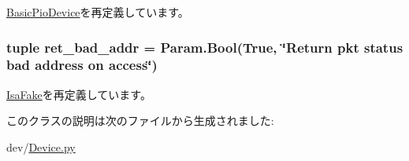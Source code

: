 \hyperlink{classDevice_1_1BasicPioDevice_aac8239d62c5a04a05fcc71d4ac63fdb4}{BasicPioDevice}を再定義しています。\hypertarget{classDevice_1_1BadAddr_afe050af66b0ed365423418f0163f2e10}{
\subsubsection[{ret\_\-bad\_\-addr}]{\setlength{\rightskip}{0pt plus 5cm}tuple {\bf ret\_\-bad\_\-addr} = Param.Bool(True, \char`\"{}Return pkt status bad address on access\char`\"{})}}
\label{classDevice_1_1BadAddr_afe050af66b0ed365423418f0163f2e10}


\hyperlink{classDevice_1_1IsaFake_afe050af66b0ed365423418f0163f2e10}{IsaFake}を再定義しています。

このクラスの説明は次のファイルから生成されました:\begin{DoxyCompactItemize}
\item 
dev/\hyperlink{Device_8py}{Device.py}\end{DoxyCompactItemize}
